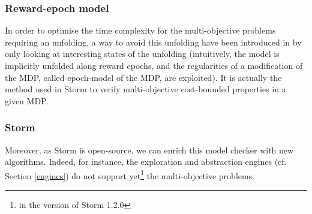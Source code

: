   \subsubsection*{\textbf{Reward-epoch model}}
    In order to optimise the time
    complexity for the multi-objective problems requiring
    an unfolding, a way to avoid this unfolding have been introduced in \cite{10.1007/978-3-319-89963-3_19} by only looking at interesting states of the unfolding (intuitively, the model is implicitly unfolded along reward epochs, and the regularities of a modification of the MDP, called epoch-model of the MDP, are exploited).
    It is actually the method used in Storm to verify multi-objective cost-bounded properties in a given MDP.

  \subsubsection*{\textbf{Storm}}
    Moreover, as Storm is open-source, we can enrich this model checker with
    new algorithms.
    Indeed, for instance, the exploration and abstraction engines (cf. Section \ref{engines}) do not support yet\footnote{ in the version of Storm 1.2.0} the multi-objective problems.
